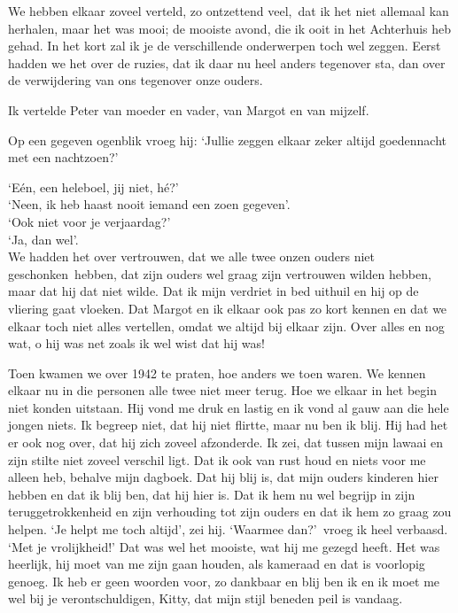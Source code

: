 \documentclass{book}
\begin{document}
We hebben elkaar zoveel verteld, zo ontzettend veel,~dat ik het niet allemaal
kan herhalen, maar het was mooi; de mooiste avond, die ik ooit in het Achterhuis
heb gehad. In het kort zal ik je de verschillende onderwerpen toch wel zeggen.
Eerst hadden we het over de ruzies, dat ik daar nu heel anders tegenover sta,
dan over de verwijdering van ons tegenover onze ouders.

Ik vertelde Peter van moeder en vader, van Margot en van mijzelf.

Op een gegeven ogenblik vroeg hij: `Jullie zeggen elkaar zeker altijd
goedennacht met een nachtzoen?'

`Eén, een heleboel, jij niet, hé?'\\
`Neen, ik heb haast nooit iemand een zoen
gegeven'.\\
`Ook niet voor je verjaardag?'\\
`Ja, dan wel'.\\
We hadden het over
vertrouwen, dat we alle twee onzen ouders niet geschonken~hebben, dat zijn
ouders wel graag zijn vertrouwen wilden hebben, maar dat hij dat niet wilde. Dat
ik mijn verdriet in bed uithuil en hij op de vliering gaat vloeken. Dat Margot
en ik elkaar ook pas zo kort kennen en dat we elkaar toch niet alles vertellen,
omdat we altijd bij elkaar zijn. Over alles en nog wat, o hij was net zoals ik
wel wist dat hij was!

Toen kwamen we over 1942 te praten, hoe anders we toen waren. We kennen elkaar
nu in die personen alle twee niet meer terug. Hoe we elkaar in het begin niet
konden uitstaan. Hij vond me druk en lastig en ik vond al gauw aan die hele
jongen niets. Ik begreep niet, dat hij niet flirtte, maar nu ben ik blij. Hij
had het er ook nog over, dat hij zich zoveel afzonderde. Ik zei, dat tussen mijn
lawaai en zijn stilte niet zoveel verschil ligt. Dat ik ook van rust houd en
niets voor me alleen heb, behalve mijn dagboek. Dat hij blij is, dat mijn ouders
kinderen hier hebben en dat ik blij ben, dat hij hier is. Dat ik hem nu wel
begrijp in zijn teruggetrokkenheid en zijn verhouding tot zijn ouders en dat ik
hem zo graag zou helpen. `Je helpt me toch altijd', zei hij. `Waarmee
dan?'~vroeg ik heel verbaasd. `Met je vrolijkheid!' Dat was wel het mooiste, wat
hij me gezegd heeft. Het was heerlijk, hij moet van me zijn gaan houden, als
kameraad en dat is voorlopig genoeg. Ik heb er geen woorden voor, zo dankbaar en
blij ben ik en ik moet me wel bij je verontschuldigen, Kitty, dat mijn stijl
beneden peil is vandaag.
\end{document}
